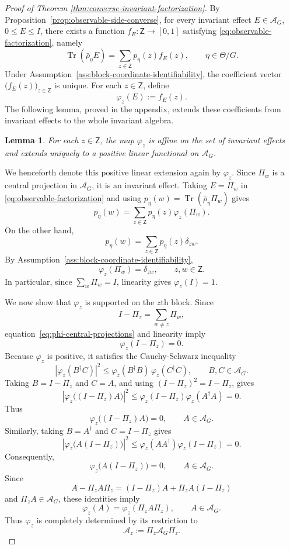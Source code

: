 \documentclass{article}
\newtheorem{lemma}[theorem]{Lemma}
\theoremstyle{named}
\theoremstyle{named1}
\newcommand{\Tr}{\operatorname{Tr}}
\newcommand{\cA}{\mathcal A}
\theoremstyle{plain}
\theoremstyle{remark}
\begin{document}
\begin{proof}[Proof of Theorem \ref{thm:converse-invariant-factorization}]
By Proposition~\ref{prop:observable-side-converse}, for every
invariant effect $E\in\cA_G$, $0\leq E\leq I$, there exists
a function $f_E:\mathsf Z\to[0,1]$ satisfying
\eqref{eq:observable-factorization}, namely
\[
    \Tr(\bar\rho_\eta E)
    =
    \sum_{z\in\mathsf Z}p_\eta(z)f_E(z),
    \qquad \eta\in\Theta/G.
\]
Under Assumption~\ref{ass:block-coordinate-identifiability},
the coefficient vector
$\bigl(f_E(z)\bigr)_{z\in\mathsf Z}$ is unique.
For each $z\in\mathsf Z$, define
\[
    \varphi_z(E):=f_E(z).
\]
The following lemma, proved in the appendix, extends these
coefficients from invariant effects to the whole invariant
algebra.

\begin{lemma}
\label{phi_z_ext}
For each $z\in\mathsf Z$, the map $\varphi_z$ is affine
on the set of invariant effects and extends uniquely to
a positive linear functional on $\cA_G$.
\end{lemma}

We henceforth denote this positive linear extension again
by $\varphi_z$. Since $\Pi_w$ is a central projection in
$\cA_G$, it is an invariant effect. Taking $E=\Pi_w$ in
\eqref{eq:observable-factorization} and using
$p_\eta(w)=\Tr(\bar\rho_\eta\Pi_w)$ gives
\[
    p_\eta(w)
    =
    \sum_{z\in\mathsf Z}
    p_\eta(z)\varphi_z(\Pi_w).
\]
On the other hand,
\[
    p_\eta(w)
    =
    \sum_{z\in\mathsf Z}
    p_\eta(z)\delta_{zw}.
\]
By Assumption~\ref{ass:block-coordinate-identifiability},
\begin{equation}
    \varphi_z(\Pi_w)
    =
    \delta_{zw},
    \qquad z,w\in\mathsf Z.
    \label{eq:phi-central-projections}
\end{equation}
In particular, since $\sum_w\Pi_w=I$, linearity gives
$\varphi_z(I)=1$.

We now show that $\varphi_z$ is supported on the $z$th
block. Since
\[
    I-\Pi_z
    =
    \sum_{w\neq z}\Pi_w,
\]
equation~\eqref{eq:phi-central-projections} and linearity
imply
\[
    \varphi_z(I-\Pi_z)=0.
\]
Because $\varphi_z$ is positive, it satisfies the
Cauchy-Schwarz inequality
\[
    |\varphi_z(B^\dagger C)|^2
    \leq
    \varphi_z(B^\dagger B)\,
    \varphi_z(C^\dagger C),
    \qquad B,C\in\cA_G.
\]
Taking $B=I-\Pi_z$ and $C=A$, and using
$(I-\Pi_z)^2=I-\Pi_z$, gives
\[
    \left|\varphi_z\bigl((I-\Pi_z)A\bigr)\right|^2
    \leq
    \varphi_z(I-\Pi_z)\varphi_z(A^\dagger A)
    =
    0.
\]
Thus
\[
    \varphi_z\bigl((I-\Pi_z)A\bigr)=0,
    \qquad A\in\cA_G.
\]
Similarly, taking $B=A^\dagger$ and $C=I-\Pi_z$ gives
\[
    \left|\varphi_z\bigl(A(I-\Pi_z)\bigr)\right|^2
    \leq
    \varphi_z(AA^\dagger)\varphi_z(I-\Pi_z)
    =
    0.
\]
Consequently,
\[
    \varphi_z\bigl(A(I-\Pi_z)\bigr)=0,
    \qquad A\in\cA_G.
\]
Since
\[
    A-\Pi_zA\Pi_z
    =
    (I-\Pi_z)A+\Pi_zA(I-\Pi_z)
\]
and $\Pi_zA\in\cA_G$, these identities imply
\begin{equation}
    \varphi_z(A)
    =
    \varphi_z(\Pi_zA\Pi_z),
    \qquad A\in\cA_G.
    \label{eq:phi-block-support}
\end{equation}
Thus $\varphi_z$ is completely determined by its
restriction to
\[
    \cA_z:=\Pi_z\cA_G\Pi_z.
\]


\end{proof}
\end{document}
